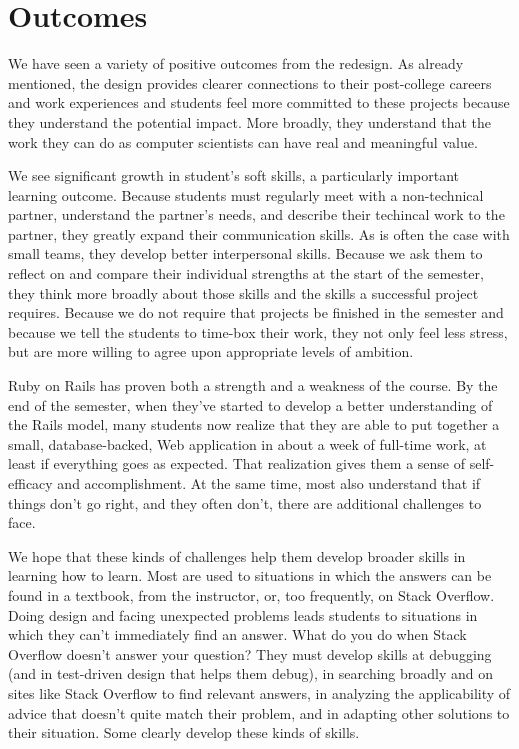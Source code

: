 \section{Outcomes}

We have seen a variety of positive outcomes from the redesign.  As
already mentioned, the design provides clearer connections to their
post-college careers and work experiences and students feel more
committed to these projects because they understand the potential
impact.  More broadly, they understand that the work they can do
as computer scientists can have real and meaningful value.

We see significant growth in student's soft skills, a particularly
important learning outcome.
Because students must regularly meet with a
non-technical partner, understand the partner's needs, and
describe their techincal work to the partner,
they greatly expand their communication skills.
As is often the case with small teams, they develop better interpersonal
skills.  Because we ask them to reflect on and compare their individual
strengths at the start of the semester,
they think more broadly
about those skills and the skills a successful
project requires.  
Because we do
not require that projects be finished in the semester and because
we tell the students to time-box their work, they not only feel
less stress, but are more willing to agree upon appropriate levels
of ambition. 

Ruby on Rails has proven both a strength and a weakness
of the course.  By the end of the semester, when they've started to develop
a better understanding of the Rails model, many students now realize that they 
are able to put together a small, database-backed, Web application
in about a week of full-time work, at least if everything goes as
expected.  
That realization gives them a sense of self-efficacy
and accomplishment.  At the same time, most also understand that if things
don't go right, and they often don't, there are additional challenges
to face.

We hope that these kinds of challenges help them develop broader
skills in learning how to learn.  Most are used to situations in
which the answers can be found in a textbook, from the instructor,
or, too frequently, on Stack Overflow.  Doing design and facing 
unexpected problems leads students to situations in
which they can't immediately find an answer.  What do you do when
Stack Overflow doesn't answer your question?  They must develop skills
at debugging (and in test-driven design that helps them
debug), in searching broadly and on sites like Stack Overflow
to find relevant answers, in analyzing the applicability of advice
that doesn't quite match their problem, and in adapting other
solutions to their situation.  Some clearly develop these kinds
of skills.  

